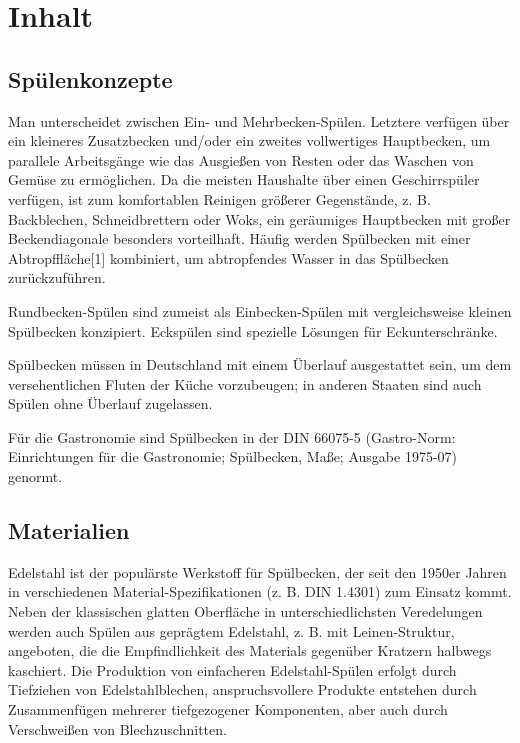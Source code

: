 \chapter{Inhalt}

\section{Spülenkonzepte}
Man unterscheidet zwischen Ein- und Mehrbecken-Spülen. Letztere verfügen über ein kleineres Zusatzbecken und/oder ein zweites vollwertiges Hauptbecken, um parallele Arbeitsgänge wie das Ausgießen von Resten oder das Waschen von Gemüse zu ermöglichen. Da die meisten Haushalte über einen Geschirrspüler verfügen, ist zum komfortablen Reinigen größerer Gegenstände, z. B. Backblechen, Schneidbrettern oder Woks, ein geräumiges Hauptbecken mit großer Beckendiagonale besonders vorteilhaft. Häufig werden Spülbecken mit einer Abtropffläche[1] kombiniert, um abtropfendes Wasser in das Spülbecken zurückzuführen.

Rundbecken-Spülen sind zumeist als Einbecken-Spülen mit vergleichsweise kleinen Spülbecken konzipiert. Eckspülen sind spezielle Lösungen für Eckunterschränke. \cite{moore}\cite{MopOverview}

Spülbecken müssen in Deutschland mit einem Überlauf ausgestattet sein, um dem versehentlichen Fluten der Küche vorzubeugen; in anderen Staaten sind auch Spülen ohne Überlauf zugelassen.\cite{scala}\cite{rltl}

Für die Gastronomie sind Spülbecken in der DIN 66075-5 (Gastro-Norm: Einrichtungen für die Gastronomie; Spülbecken, Maße; Ausgabe 1975-07) genormt.


\section{Materialien}
Edelstahl ist der populärste Werkstoff für Spülbecken, der seit den 1950er Jahren in verschiedenen Material-Spezifikationen (z. B. DIN 1.4301) zum Einsatz kommt. Neben der klassischen glatten Oberfläche in unterschiedlichsten Veredelungen werden auch Spülen aus geprägtem Edelstahl, z. B. mit Leinen-Struktur, angeboten, die die Empfindlichkeit des Materials gegenüber Kratzern halbwegs kaschiert. Die Produktion von einfacheren Edelstahl-Spülen erfolgt durch Tiefziehen von Edelstahlblechen, anspruchsvollere Produkte entstehen durch Zusammenfügen mehrerer tiefgezogener Komponenten, aber auch durch Verschweißen von Blechzuschnitten. \cite{bitkom}\cite{Leucker02}

